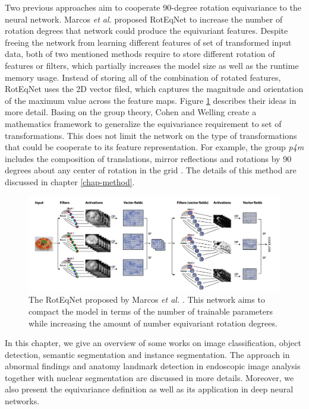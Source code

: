 Two previous approaches aim to cooperate 90-degree rotation equivariance to the neural network. Marcos \textit{et al.} proposed RotEqNet \cite{DBLP:journals/corr/GonzalezVKT16} to increase the number of rotation degrees that network could produce the equivariant features. Despite freeing the network from learning different features of set of transformed input data, both of two mentioned methods require to store different rotation of features or filters, which partially increases the model size as well as the runtime memory usage. Instead of storing all of the combination of rotated features, RotEqNet \cite{DBLP:journals/corr/GonzalezVKT16} uses the 2D vector filed, which captures the magnitude and orientation of the maximum value across the feature maps. Figure \ref{fig:vector_field} describes their ideas in more detail. Basing on the group theory, Cohen and Welling create a mathematics framework \cite{gcnn} to generalize the equivariance requirement to set of transformations. This does not limit the network on the type of transformations that could be cooperate to its feature representation. For example, the group \textit{p4m} includes the composition of translations, mirror reflections and rotations by 90 degrees about any center of rotation in the grid \cite{gcnn}. The details of this method are discussed in chapter \ref{chap-method}. 

\begin{figure}[thb]
    \centering
    \includegraphics[width=\textwidth]{resources/2_vector_field.png}
    \caption{The RotEqNet proposed by Marcos \textit{et al.} \cite{DBLP:journals/corr/GonzalezVKT16}. This network aims to compact the model in terms of the number of trainable parameters while increasing the amount of number equivariant rotation degrees.}
    \label{fig:vector_field}
\end{figure}

\begin{ChapAbstract}
In this chapter, we give an overview of some works on image classification, object detection, semantic segmentation and instance segmentation. The approach in abnormal findings and anatomy landmark detection in endoscopic image analysis together with nuclear segmentation are discussed in more details. Moreover, we also present the equivariance definition as well as its application in deep neural networks.
\end{ChapAbstract}